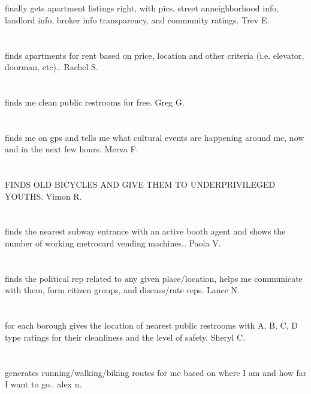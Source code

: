 \section{}finally gets apartment listings right,  with pics,  street anneighborhood info,  landlord info,  broker info transparency,  and community ratings. Trev E.
\section{}finds apartments for rent based on price,  location and other criteria (i.e. elevator,  doorman,  etc).. Rachel S.
\section{} finds me clean public restrooms for free. Greg  G.
\section{}finds me on gps and tells me what cultural events are happening around me,  now and in the next few hours. Merva F.
\section{} FINDS OLD BICYCLES AND GIVE THEM TO UNDERPRIVILEGED YOUTHS. Vimon R.
\section{}finds the nearest subway entrance with an active booth agent and shows the number of working metrocard vending machines.. Paola V.
\section{}finds the political rep related to any given place/location,  helps me communicate with them,  form citizen groups,  and discuss/rate reps. Lance N.
\section{}for each borough gives the location of nearest public restrooms with A,  B,  C,  D type ratings for their cleanliness and the level of safety. Sheryl C.
\section{}generates running/walking/biking routes for me based on where I am and how far I want to go.. alex n.

